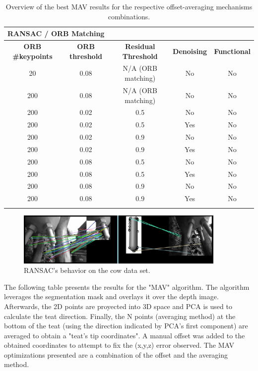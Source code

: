 \begin{longtable}{|c|c|c|c||c|}                            \hline
\multicolumn{5}{|l|}{\textbf{RANSAC / ORB Matching}}              \\\hline
\textbf{ORB \#keypoints} & \textbf{ORB threshold} & \textbf{Residual Threshold} & \textbf{Denoising}       & \textbf{Functional}      \\ \hline
        20      & 0.08      & N/A (ORB matching)       & No     &  No               \\ \hline
        200     & 0.08      & N/A (ORB matching)       & No     &  No               \\ \hline
        200     & 0.02      & 0.5       & No     &  No               \\ \hline
        200     & 0.02      & 0.5       & Yes    &  No               \\ \hline
        200     & 0.02      & 0.9       & No     &  No               \\ \hline
        200     & 0.02      & 0.9       & Yes    &  No               \\ \hline
        200     & 0.08      & 0.5       & No     &  No               \\ \hline
        200     & 0.08      & 0.5       & Yes    &  No               \\ \hline
        200     & 0.08      & 0.9       & No     &  No               \\ \hline
        200     & 0.08      & 0.9       & Yes    &  No               \\ \hline
\caption{Overview of the best MAV results for the respective offset-averaging mechanisms combinations.} \label{tab:ransac-results}                          
\end{longtable}

 \begin{figure}[h]
        \centering
        \includegraphics[width=0.9\textwidth]{images/cow_ransac.png}
        \caption{RANSAC's behavior on the cow data set.}
        \label{fig:ransac-results}
    \end{figure}
    
The following table 
presents the results for the "MAV" algorithm. The algorithm leverages the segmentation mask and overlays it over the depth image. Afterwards, the 2D points are proyected into 3D space and PCA is used to calculate the teat direction. Finally, the N points (averaging method) at the bottom of the teat (using the direction indicated by PCA's first component) are averaged to obtain a "teat's tip coordinates". A manual offset was added to the obtained coordinates to attempt to fix the (x,y,z) error observed. The MAV optimizations presented are a combination of the offset and the averaging method.

